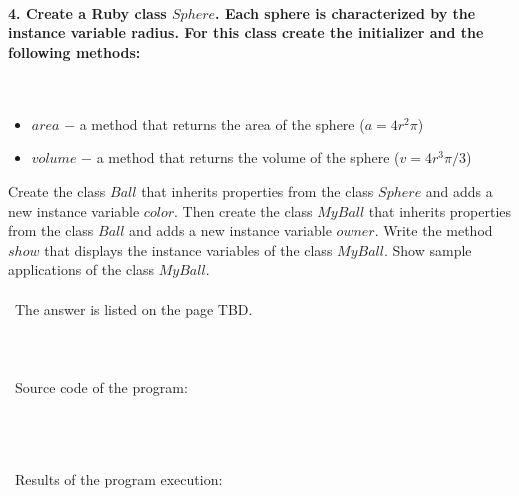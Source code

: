 \documentclass{article}
\begin{document}
\paragraph{}\



\paragraph{4. Create a Ruby class \(Sphere\). Each sphere is characterized by the instance variable radius. For this class create the initializer and the following methods: }\

	\begin{itemize}
		\item \(area\) \(-\) a method that returns the area of the sphere (\(a = 4r^2\pi\))
		\item \(volume\) \(-\) a method that returns the volume of the sphere (\(v = 4r^3\pi / 3\))
	\end{itemize}
	
	Create the class \(Ball\) that inherits properties from the class \(Sphere\) and adds a new instance variable \(color\). Then create the class \(MyBall\) that inherits properties from the class \(Ball\) and adds a new instance variable \(owner\). Write the method \(show\) that displays the instance variables of the class \(MyBall\). Show sample applications of the class \(MyBall\).

\paragraph{}\
	The answer is listed on the page TBD.
	
\paragraph{}\
\paragraph{}\
Source code of the program:

\begin{verbatim}
\end{verbatim}

\paragraph{}\
\paragraph{}\
	Results of the program execution:
	
\begin{verbatim} 
\end{verbatim}

\paragraph{}\
\paragraph{}\
\end{document}
